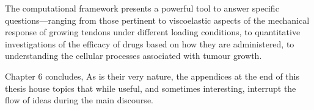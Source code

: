 The computational framework presents a powerful tool to answer
specific questions—ranging from those pertinent to viscoelastic
aspects of the mechanical response of growing tendons under different
loading conditions, to quantitative investigations of the efficacy of
drugs based on how they are administered, to understanding the
cellular processes associated with tumour growth.

Chapter 6 concludes, As is their very nature, the appendices at the end of this thesis
house topics that while useful, and sometimes interesting, interrupt
the flow of ideas during the main
discourse.

